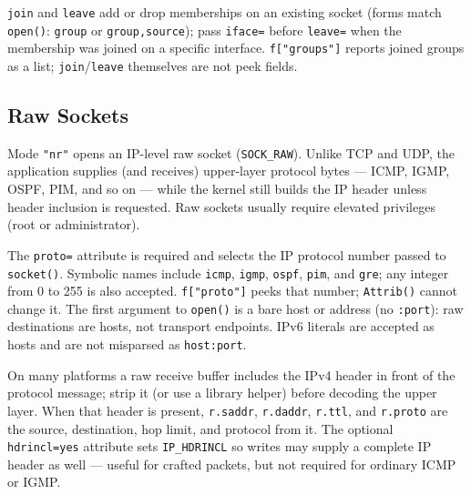 
\texttt{join} and \texttt{leave} add or drop memberships on an existing
socket (forms match \texttt{open()}: \texttt{group} or
\texttt{group,source}); pass \texttt{iface=} before \texttt{leave=}
when the membership was joined on a specific interface.
\texttt{f["groups"]} reports joined groups as a list;
\texttt{join}/\texttt{leave}
themselves are not peek fields.

\subsection*{Raw Sockets}
Mode \texttt{"nr"} opens an IP-level raw socket
(\texttt{SOCK\_RAW}). Unlike TCP and UDP, the application supplies
(and receives) upper-layer protocol bytes --- ICMP, IGMP, OSPF, PIM,
and so on --- while the kernel still builds the IP header unless
header inclusion is requested. Raw sockets usually require elevated
privileges (root or administrator).

The \texttt{proto=} attribute is required and selects the IP protocol
number passed to \texttt{socket()}. Symbolic names include
\texttt{icmp}, \texttt{igmp}, \texttt{ospf}, \texttt{pim}, and
\texttt{gre}; any integer from 0 to 255 is also accepted.
\texttt{f["proto"]} peeks that number; \texttt{Attrib()} cannot
change it. The first
argument to \texttt{open()} is a bare host or address (no
\texttt{:port}): raw destinations are hosts, not transport endpoints.
IPv6 literals are accepted as hosts and are not misparsed as
\texttt{host:port}.


On many platforms a raw receive buffer includes the IPv4 header in
front of the protocol message; strip it (or use a library helper)
before decoding the upper layer. When that header is present,
\texttt{r.saddr}, \texttt{r.daddr}, \texttt{r.ttl}, and
\texttt{r.proto} are the source, destination, hop limit, and
protocol from it. The optional \texttt{hdrincl=yes}
attribute sets \texttt{IP\_HDRINCL} so writes may supply a complete
IP header as well --- useful for crafted packets, but not required
for ordinary ICMP or IGMP.

